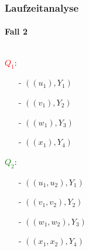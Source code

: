\begin{frame}
\frametitle{Laufzeitanalyse}
\framesubtitle{Fall 2}

\begin{columns}
	\begin{block}{}
		\textcolor{red}{$Q_1$}:
			\begin{itemize}
				\item[-] $((u_1), Y_1)$
				\item[-] $((v_1), Y_2)$
				\item[-] $((w_1), Y_3)$
				\item[-] $((x_1), Y_4)$
			\end{itemize}
		\textcolor{green}{$Q_2$}:
			\begin{itemize}
				\item[-] $((u_1, u_2), Y_1)$
				\item[-] $((v_1, v_2), Y_2)$
				\item[-] $((w_1, w_2), Y_3)$
				\item[-] $((x_1, x_2), Y_4)$
			\end{itemize}

	\end{block}


\end{columns}
\end{frame}
